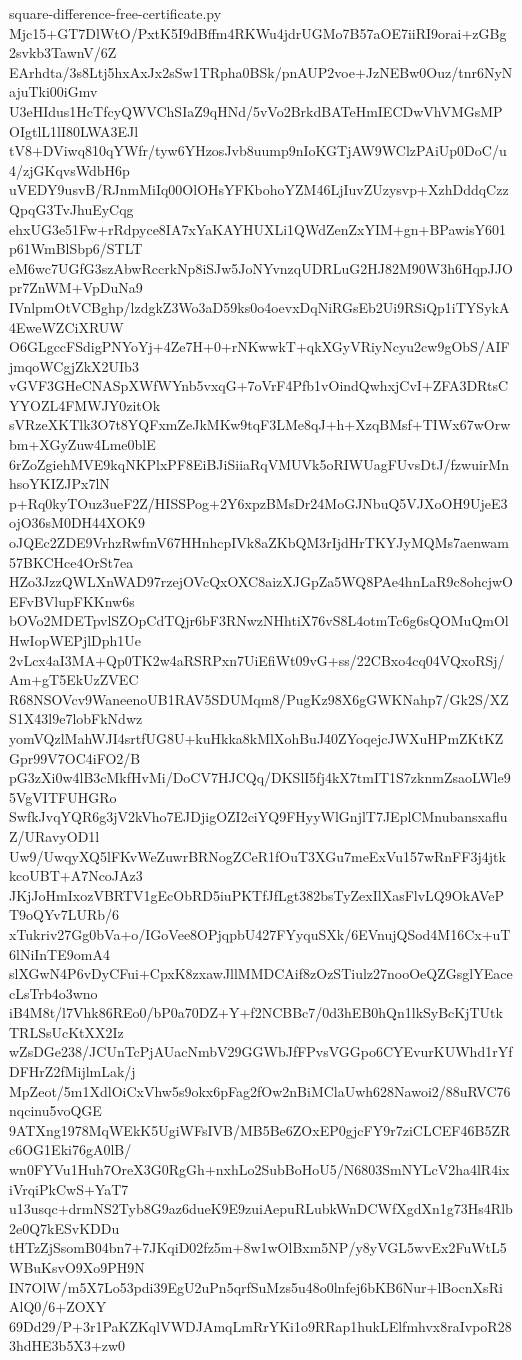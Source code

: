 \documentclass[11pt]{article}
\theoremstyle{definition}
\theoremstyle{remark}
\begin{document}
\begin{filecontents*}[overwrite]{square-difference-free-certificate.py}
Mjc15+GT7DlWtO/PxtK5I9dBffm4RKWu4jdrUGMo7B57aOE7iiRI9orai+zGBg2svkb3TawnV/6Z
EArhdta/3s8Ltj5hxAxJx2sSw1TRpha0BSk/pnAUP2voe+JzNEBw0Ouz/tnr6NyNajuTki00iGmv
U3eHIdus1HcTfcyQWVChSIaZ9qHNd/5vVo2BrkdBATeHmIECDwVhVMGsMPOIgtlL1lI80LWA3EJl
tV8+DViwq810qYWfr/tyw6YHzosJvb8uump9nIoKGTjAW9WClzPAiUp0DoC/u4/zjGKqvsWdbH6p
uVEDY9usvB/RJnmMiIq00OlOHsYFKbohoYZM46LjIuvZUzysvp+XzhDddqCzzQpqG3TvJhuEyCqg
ehxUG3e51Fw+rRdpyce8IA7xYaKAYHUXLi1QWdZenZxYIM+gn+BPawisY601p61WmBlSbp6/STLT
eM6wc7UGfG3szAbwRccrkNp8iSJw5JoNYvnzqUDRLuG2HJ82M90W3h6HqpJJOpr7ZnWM+VpDuNa9
IVnlpmOtVCBghp/lzdgkZ3Wo3aD59ks0o4oevxDqNiRGsEb2Ui9RSiQp1iTYSykA4EweWZCiXRUW
O6GLgccFSdigPNYoYj+4Ze7H+0+rNKwwkT+qkXGyVRiyNcyu2cw9gObS/AIFjmqoWCgjZkX2UIb3
vGVF3GHeCNASpXWfWYnb5vxqG+7oVrF4Pfb1vOindQwhxjCvI+ZFA3DRtsCYYOZL4FMWJY0zitOk
sVRzeXKTlk3O7t8YQFxmZeJkMKw9tqF3LMe8qJ+h+XzqBMsf+TIWx67wOrwbm+XGyZuw4Lme0blE
6rZoZgiehMVE9kqNKPlxPF8EiBJiSiiaRqVMUVk5oRIWUagFUvsDtJ/fzwuirMnhsoYKIZJPx7lN
p+Rq0kyTOuz3ueF2Z/HISSPog+2Y6xpzBMsDr24MoGJNbuQ5VJXoOH9UjeE3ojO36sM0DH44XOK9
oJQEc2ZDE9VrhzRwfmV67HHnhcpIVk8aZKbQM3rIjdHrTKYJyMQMs7aenwam57BKCHce4OrSt7ea
HZo3JzzQWLXnWAD97rzejOVcQxOXC8aizXJGpZa5WQ8PAe4hnLaR9c8ohcjwOEFvBVlupFKKnw6s
bOVo2MDETpvlSZOpCdTQjr6bF3RNwzNHhtiX76vS8L4otmTc6g6sQOMuQmOlHwIopWEPjlDph1Ue
2vLcx4aI3MA+Qp0TK2w4aRSRPxn7UiEfiWt09vG+ss/22CBxo4cq04VQxoRSj/Am+gT5EkUzZVEC
R68NSOVcv9WaneenoUB1RAV5SDUMqm8/PugKz98X6gGWKNahp7/Gk2S/XZS1X43l9e7lobFkNdwz
yomVQzlMahWJI4srtfUG8U+kuHkka8kMlXohBuJ40ZYoqejcJWXuHPmZKtKZGpr99V7OC4iFO2/B
pG3zXi0w4lB3cMkfHvMi/DoCV7HJCQq/DKSlI5fj4kX7tmIT1S7zknmZsaoLWle95VgVITFUHGRo
SwfkJvqYQR6g3jV2kVho7EJDjigOZI2ciYQ9FHyyWlGnjlT7JEplCMnubansxafluZ/URavyOD1l
Uw9/UwqyXQ5lFKvWeZuwrBRNogZCeR1fOuT3XGu7meExVu157wRnFF3j4jtkkcoUBT+A7NcoJAz3
JKjJoHmIxozVBRTV1gEcObRD5iuPKTfJfLgt382bsTyZexIlXasFlvLQ9OkAVePT9oQYv7LURb/6
xTukriv27Gg0bVa+o/IGoVee8OPjqpbU427FYyquSXk/6EVnujQSod4M16Cx+uT6lNiInTE9omA4
slXGwN4P6vDyCFui+CpxK8zxawJllMMDCAif8zOzSTiulz27nooOeQZGsglYEacecLsTrb4o3wno
iB4M8t/l7Vhk86REo0/bP0a70DZ+Y+f2NCBBc7/0d3hEB0hQn1lkSyBcKjTUtkTRLSsUcKtXX2Iz
wZsDGe238/JCUnTcPjAUacNmbV29GGWbJfFPvsVGGpo6CYEvurKUWhd1rYfDFHrZ2fMijlmLak/j
MpZeot/5m1XdlOiCxVhw5s9okx6pFag2fOw2nBiMClaUwh628Nawoi2/88uRVC76nqcinu5voQGE
9ATXng1978MqWEkK5UgiWFsIVB/MB5Be6ZOxEP0gjcFY9r7ziCLCEF46B5ZRc6OG1Eki76gA0lB/
wn0FYVu1Huh7OreX3G0RgGh+nxhLo2SubBoHoU5/N6803SmNYLcV2ha4lR4ixiVrqiPkCwS+YaT7
u13usqc+drmNS2Tyb8G9az6dueK9E9zuiAepuRLubkWnDCWfXgdXn1g73Hs4Rlb2e0Q7kESvKDDu
tHTzZjSsomB04bn7+7JKqiD02fz5m+8w1wOlBxm5NP/y8yVGL5wvEx2FuWtL5WBuKsvO9Xo9PH9N
IN7OlW/m5X7Lo53pdi39EgU2uPn5qrfSuMzs5u48o0lnfej6bKB6Nur+lBocnXsRiAlQ0/6+ZOXY
69Dd29/P+3r1PaKZKqlVWDJAmqLmRrYKi1o9RRap1hukLElfmhvx8raIvpoR283hdHE3b5X3+zw0

\end{filecontents*}
\end{document}

